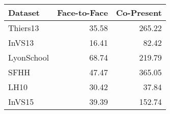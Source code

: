 \begin{tabular}{lrr}
\hline
 Dataset    &   Face-to-Face &   Co-Present \\
\hline
 Thiers13   &          35.58 &       265.22 \\
 InVS13     &          16.41 &        82.42 \\
 LyonSchool &          68.74 &       219.79 \\
 SFHH       &          47.47 &       365.05 \\
 LH10       &          30.42 &        37.84 \\
 InVS15     &          39.39 &       152.74 \\
\hline
\end{tabular}